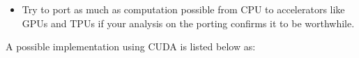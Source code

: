{\begin{itemize}
    numerical framework you are using. For a first exposure to vectorized operations you can have a look at \cite{Hager2010}. For in depth understanding of 
    computer architecture that leads to the vectorized operations please refer to either \cite{Patterson2014} or \cite{Hennessy2019}.
    \item Try to port as much as computation possible from \ac{CPU} to accelerators like \ac{GPU}s and \ac{TPU}s if 
    your analysis on the porting confirms it to be worthwhile.
  \end{itemize}
  A possible \pytorch\cite{LFMAI2023} implementation using \ac{CUDA}\cite{Nvidia} is listed below as:
\clearpage %
}